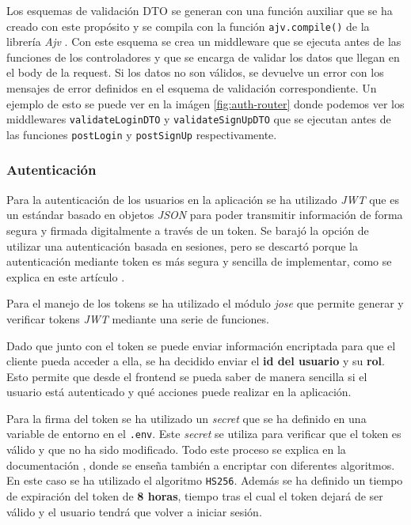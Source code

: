 Los esquemas de validación DTO se generan con una función auxiliar que se ha creado con este
propósito y se compila con la función \texttt{ajv.compile()} de la librería \textit{Ajv}
\cite{ajv-methods}. Con este esquema se crea un middleware que se ejecuta antes de las
funciones de los controladores y que se encarga de validar los datos que llegan en el body
de la request. Si los datos no son válidos, se devuelve un error con los mensajes de error
definidos en el esquema de validación correspondiente. Un ejemplo de esto se puede ver en
la imágen \ref{fig:auth-router} donde podemos ver los middlewares \texttt{validateLoginDTO}
y \texttt{validateSignUpDTO} que se ejecutan antes de las funciones \texttt{postLogin} y
\texttt{postSignUp} respectivamente.

\newpage

\subsubsection{Autenticación}
Para la autenticación de los usuarios en la aplicación se ha utilizado \textit{JWT}
\cite{jwt} que es un estándar basado en objetos \textit{JSON} para poder transmitir
información de forma segura y firmada digitalmente a través de un token. Se barajó la
opción de utilizar una autenticación basada en sesiones, pero se descartó porque
la autenticación mediante token es más segura y sencilla de implementar, como se
explica en este artículo \cite{token-vs-session}.

Para el manejo de los tokens se ha utilizado el módulo \textit{jose} \cite{jose} que
permite generar y verificar tokens \textit{JWT} \cite{jwt} mediante una serie de funciones.

Dado que junto con el token se puede enviar información encriptada para que el cliente
pueda acceder a ella, se ha decidido enviar el \textbf{id del usuario} y su \textbf{rol}.
Esto permite que desde el frontend se pueda saber de manera sencilla si el usuario está
autenticado y qué acciones puede realizar en la aplicación.

Para la firma del token se ha utilizado un \textit{secret} que se ha definido en una
variable de entorno en el \texttt{.env}. Este \textit{secret} se utiliza para verificar
que el token es válido y que no ha sido modificado. Todo este proceso se explica en la
documentación \cite{jose-sign}, donde se enseña también a encriptar con diferentes
algoritmos. En este caso se ha utilizado el algoritmo \texttt{HS256}. Además se ha
definido un tiempo de expiración del token de \textbf{8 horas}, tiempo tras el cual
el token dejará de ser válido y el usuario tendrá que volver a iniciar sesión.

